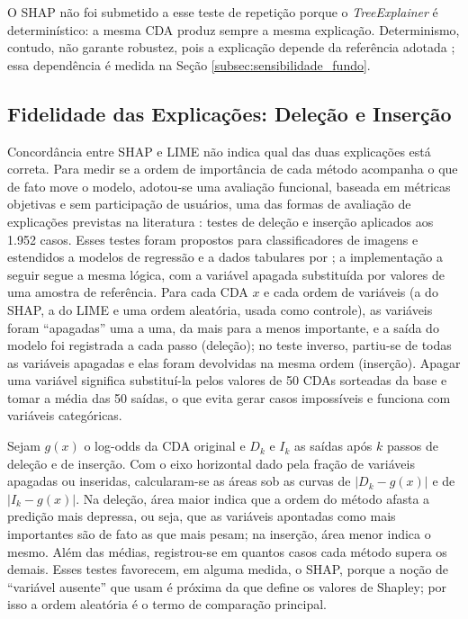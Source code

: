 O SHAP não foi submetido a esse teste de repetição porque o \textit{TreeExplainer} é determinístico: a mesma CDA produz sempre a mesma explicação. Determinismo, contudo, não garante robustez, pois a explicação depende da referência adotada \cite{molnarInterpretableMachineLearning}; essa dependência é medida na Seção \ref{subsec:sensibilidade_fundo}.

\subsection{Fidelidade das Explicações: Deleção e Inserção}
\label{subsec:delecao_insercao}

Concordância entre SHAP e LIME não indica qual das duas explicações está correta. Para medir se a ordem de importância de cada método acompanha o que de fato move o modelo, adotou-se uma avaliação funcional, baseada em métricas objetivas e sem participação de usuários, uma das formas de avaliação de explicações previstas na literatura \cite{doshi-velezTowardsRigorousScience2017}: testes de deleção e inserção aplicados aos 1.952 casos. Esses testes foram propostos para classificadores de imagens e estendidos a modelos de regressão e a dados tabulares por ; a implementação a seguir segue a mesma lógica, com a variável apagada substituída por valores de uma amostra de referência. Para cada CDA $x$ e cada ordem de variáveis (a do SHAP, a do LIME e uma ordem aleatória, usada como controle), as variáveis foram ``apagadas'' uma a uma, da mais para a menos importante, e a saída do modelo foi registrada a cada passo (deleção); no teste inverso, partiu-se de todas as variáveis apagadas e elas foram devolvidas na mesma ordem (inserção). Apagar uma variável significa substituí-la pelos valores de 50 CDAs sorteadas da base e tomar a média das 50 saídas, o que evita gerar casos impossíveis e funciona com variáveis categóricas.

Sejam $g(x)$ o log-odds da CDA original e $D_k$ e $I_k$ as saídas após $k$ passos de deleção e de inserção. Com o eixo horizontal dado pela fração de variáveis apagadas ou inseridas, calcularam-se as áreas sob as curvas de $|D_k - g(x)|$ e de $|I_k - g(x)|$. Na deleção, área maior indica que a ordem do método afasta a predição mais depressa, ou seja, que as variáveis apontadas como mais importantes são de fato as que mais pesam; na inserção, área menor indica o mesmo. Além das médias, registrou-se em quantos casos cada método supera os demais. Esses testes favorecem, em alguma medida, o SHAP, porque a noção de ``variável ausente'' que usam é próxima da que define os valores de Shapley; por isso a ordem aleatória é o termo de comparação principal.

